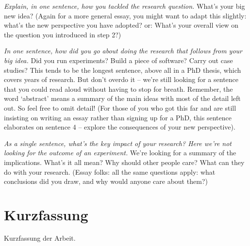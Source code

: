 \emph{Explain, in one sentence, how you tackled the research question.}
What’s your big new idea?
(Again for a more general essay, you might want to adapt this slightly: what’s the new perspective you have adopted? or:
What’s your overall view on the question you introduced in step 2?)

\emph{In one sentence, how did you go about doing the research that follows from your big idea.}
Did you run experiments?
Build a piece of software?
Carry out case studies?
This tends to be the longest sentence, above all in a PhD thesis, which covers years of research.
But don’t overdo it – we’re still looking for a sentence that you could read aloud without having to stop for breath.
Remember, the word ‘abstract’ means a summary of the main ideas with most of the detail left out.
So feel free to omit detail!
(For those of you who got this far and are still insisting on writing an essay rather than signing up for a PhD, this sentence elaborates on sentence 4 – explore the consequences of your new perspective).

\emph{As a single sentence, what’s the key impact of your research?
  Here we’re not looking for the outcome of an experiment.
}
We’re looking for a summary of the implications.
What’s it all mean?
Why should other people care?
What can they do with your research.
(Essay folks: all the same questions apply: what conclusions did you draw, and why would anyone care about them?)


\section*{Kurzfassung}
\begin{otherlanguage}{ngerman}
  Kurzfassung der Arbeit.
\end{otherlanguage}



%
%
\tableofcontents

